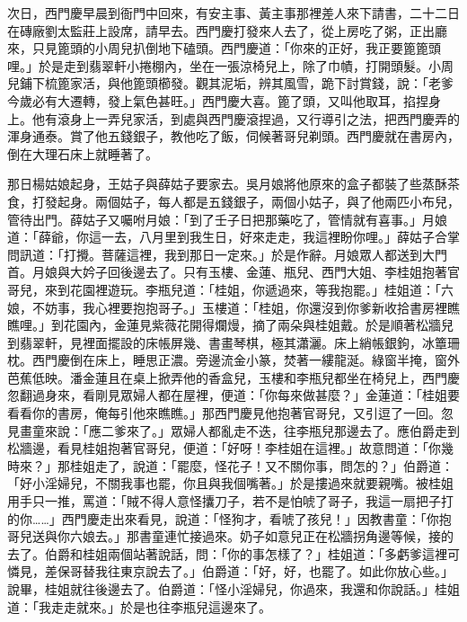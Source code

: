 次日，西門慶早晨到衙門中回來，有安主事、黃主事那裡差人來下請書，二十二日在磚廠劉太監莊上設席，請早去。西門慶打發來人去了，從上房吃了粥，正出廳來，只見篦頭的小周兒扒倒地下磕頭。西門慶道：「你來的正好，我正要篦篦頭哩。」於是走到翡翠軒小捲棚內，坐在一張涼椅兒上，除了巾幘，打開頭髮。小周兒鋪下梳篦家活，與他篦頭櫛發。觀其泥垢，辨其風雪，跪下討賞錢，說：「老爹今歲必有大遷轉，發上氣色甚旺。」西門慶大喜。篦了頭，又叫他取耳，掐捏身上。他有滾身上一弄兒家活，到處與西門慶滾捏過，又行導引之法，把西門慶弄的渾身通泰。賞了他五錢銀子，教他吃了飯，伺候著哥兒剃頭。西門慶就在書房內，倒在大理石床上就睡著了。

那日楊姑娘起身，王姑子與薛姑子要家去。吳月娘將他原來的盒子都裝了些蒸酥茶食，打發起身。兩個姑子，每人都是五錢銀子，兩個小姑子，與了他兩匹小布兒，管待出門。薛姑子又囑咐月娘：「到了壬子日把那藥吃了，管情就有喜事。」月娘道：「薛爺，你這一去，八月里到我生日，好來走走，我這裡盼你哩。」薛姑子合掌問訊道：「打攪。菩薩這裡，我到那日一定來。」於是作辭。月娘眾人都送到大門首。月娘與大妗子回後邊去了。只有玉樓、金蓮、瓶兒、西門大姐、李桂姐抱著官哥兒，來到花園裡遊玩。李瓶兒道：「桂姐，你遞過來，等我抱罷。」桂姐道：「六娘，不妨事，我心裡要抱抱哥子。」玉樓道：「桂姐，你還沒到你爹新收拾書房裡瞧瞧哩。」到花園內，金蓮見紫薇花開得爛熳，摘了兩朵與桂姐戴。於是順著松牆兒到翡翠軒，見裡面擺設的床帳屏幾、書畫琴棋，極其瀟灑。床上綃帳銀鉤，冰簟珊枕。西門慶倒在床上，睡思正濃。旁邊流金小篆，焚著一縷龍涎。綠窗半掩，窗外芭蕉低映。潘金蓮且在桌上掀弄他的香盒兒，玉樓和李瓶兒都坐在椅兒上，西門慶忽翻過身來，看剛見眾婦人都在屋裡，便道：「你每來做甚麼？」金蓮道：「桂姐要看看你的書房，俺每引他來瞧瞧。」那西門慶見他抱著官哥兒，又引逗了一回。忽見畫童來說：「應二爹來了。」眾婦人都亂走不迭，往李瓶兒那邊去了。應伯爵走到松牆邊，看見桂姐抱著官哥兒，便道：「好呀！李桂姐在這裡。」故意問道：「你幾時來？」那桂姐走了，說道：「罷麼，怪花子！又不關你事，問怎的？」伯爵道：「好小淫婦兒，不關我事也罷，你且與我個嘴著。」於是摟過來就要親嘴。被桂姐用手只一推，罵道：「賊不得人意怪攮刀子，若不是怕唬了哥子，我這一扇把子打的你……」西門慶走出來看見，說道：「怪狗才，看唬了孩兒！」因教書童：「你抱哥兒送與你六娘去。」那書童連忙接過來。奶子如意兒正在松牆拐角邊等候，接的去了。伯爵和桂姐兩個站著說話，問：「你的事怎樣了？」桂姐道：「多虧爹這裡可憐見，差保哥替我往東京說去了。」伯爵道：「好，好，也罷了。如此你放心些。」說畢，桂姐就往後邊去了。伯爵道：「怪小淫婦兒，你過來，我還和你說話。」桂姐道：「我走走就來。」於是也往李瓶兒這邊來了。

